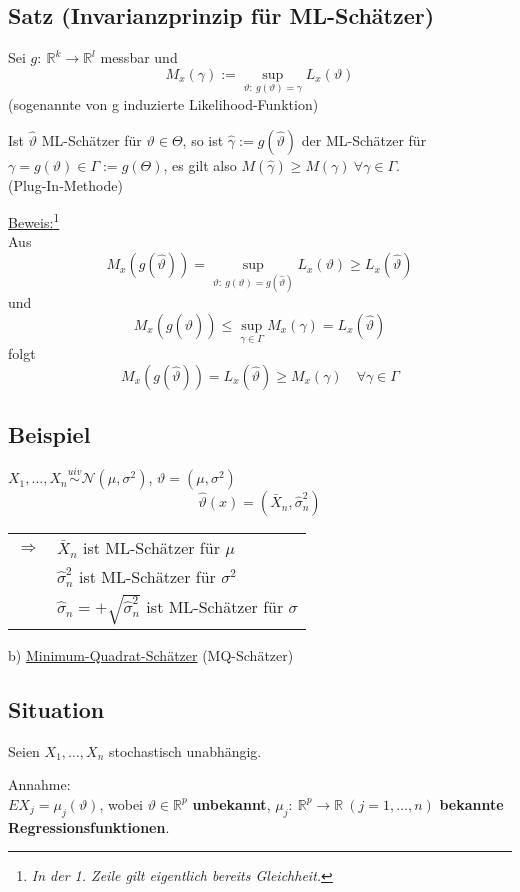 \documentclass[a4paper,11pt,twoside,titlepage]{article}
\newcommand{\R}{{\mathbb R}}
\newcommand\NN{ \mathcal{N} } %
\newcommand{\uiv}{\ensuremath{\stackrel{uiv}{\sim}}}
\begin{document}
\subsection{Satz \textnormal{(Invarianzprinzip für ML-Schätzer)}}
Sei $g:\ \R^k\to\R^l$ messbar und \[M_x(\gamma):=\sup_{\vartheta:\ g(\vartheta)=\gamma}L_x(\vartheta)\]
(sogenannte von g induzierte Likelihood-Funktion)

Ist $\hat\vartheta$ ML-Schätzer für $\vartheta\in\Theta$, so ist $\hat\gamma:=g(\hat\vartheta)$ der ML-Schätzer für $\gamma=g(\vartheta)\in\Gamma:=g(\Theta)$, es gilt also $M(\hat\gamma)\geq M(\gamma)\ \forall\gamma\in\Gamma$.\\
(Plug-In-Methode)

\underline{Beweis:}\footnote{\textit{In der 1. Zeile gilt eigentlich bereits Gleichheit.}}\\
Aus 
\[M_x(g(\hat\vartheta))=\sup_{\vartheta:\ g(\vartheta)=g(\hat\vartheta)}L_x(\vartheta)\geq L_x(\hat\vartheta)\]
und
\[M_x(g(\hat\vartheta))\leq \sup_{\gamma\in\Gamma}M_x(\gamma)=L_x(\hat\vartheta)\]
folgt
\[M_x(g(\hat\vartheta))=L_x(\hat\vartheta)\geq M_x(\gamma)\quad \forall\gamma\in\Gamma\]

\subsection{Beispiel}
$X_1,\ldots,X_n\uiv\NN(\mu,\sigma^2)$, $\vartheta=(\mu,\sigma^2)$
\[\hat\vartheta(x)=(\bar X_n,\hat\sigma_n^2)\]
\begin{tabular}{cl}
$\Rightarrow$& $\bar X_n$ ist ML-Schätzer für $\mu$\\
& $\hat\sigma_n^2$ ist ML-Schätzer für $\sigma^2$\\
& $\hat\sigma_n=+\sqrt{\hat\sigma_n^2}$ ist ML-Schätzer für $\sigma$\end{tabular}

b) \underline{Minimum-Quadrat-Schätzer} (MQ-Schätzer)

\subsection{Situation}
Seien $X_1,\ldots,X_n$ stochastisch unabhängig.

Annahme:\\
$EX_j=\mu_j(\vartheta)$, wobei $\vartheta\in\R^p$ \textbf{unbekannt}, $\mu_j:\ \R^p\to\R\ (j=1,\ldots,n)$ \textbf{bekannte Regressionsfunktionen}.
\end{document}
